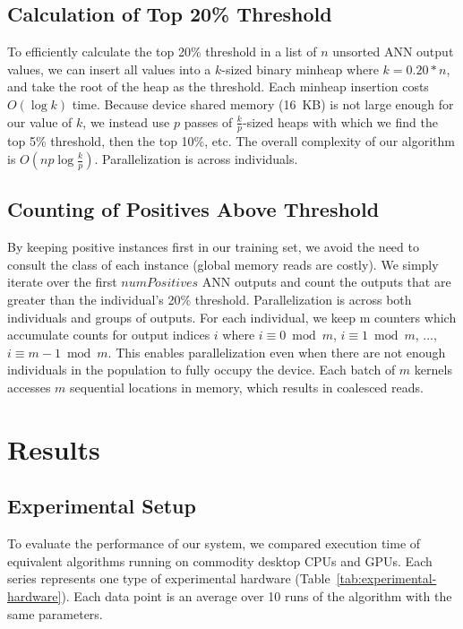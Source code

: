 \documentclass[11pt]{article}       %
\begin{document}
\subsection{Calculation of Top 20\% Threshold} \label{implementation}
To efficiently calculate the top 20\% threshold in a list of $n$ unsorted ANN output values, we can insert all values into a $k$-sized binary minheap where $k = 0.20 * n$, and take the root of the heap as the threshold. Each minheap insertion costs $O(\log k)$ time. Because device shared memory (16~KB) is not large enough for our value of $k$, we instead use $p$ passes of $\frac{k}{p}$-sized heaps with which we find the top 5\% threshold, then the top 10\%, etc. The overall complexity of our algorithm is $O(np \log \frac{k}{p})$. Parallelization is across individuals.

\subsection{Counting of Positives Above Threshold} \label{implementation}
By keeping positive instances first in our training set, we avoid the need to consult the class of each instance (global memory reads are costly). We simply iterate over the first $numPositives$ ANN outputs and count the outputs that are greater than the individual's 20\% threshold. Parallelization is across both individuals and groups of outputs. For each individual, we keep m counters which accumulate counts for output indices $i$ where $i \equiv 0 \bmod{m}$, $i \equiv 1 \bmod{m}$, ..., $i \equiv m - 1 \bmod{m}$. This enables parallelization even when there are not enough individuals in the population to fully occupy the device. Each batch of $m$ kernels accesses $m$ sequential locations in memory, which results in coalesced reads.

\section{Results} \label{results}

\subsection{Experimental Setup} \label{experiment}
To evaluate the performance of our system, we compared execution time of equivalent algorithms running on commodity desktop CPUs and GPUs. Each series represents one type of experimental hardware (Table~\ref{tab:experimental-hardware}). Each data point is an average over 10 runs of the algorithm with the same parameters.
\end{document}
